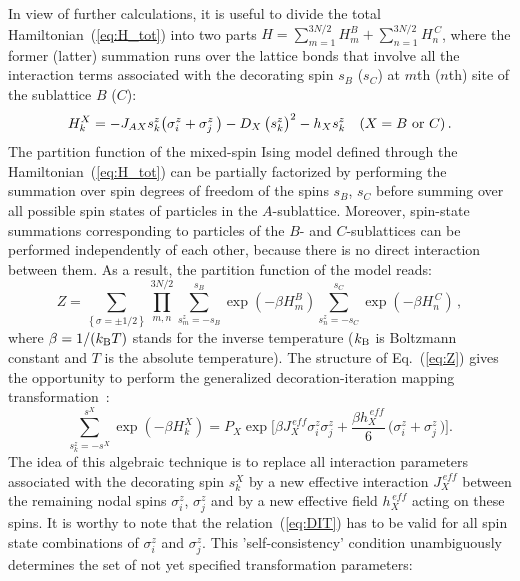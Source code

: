 \documentclass[final,5p,times,sort&compress]{elsarticle}
\begin{document}
In view of further calculations, it is useful to divide the total Hamiltonian~(\ref{eq:H_tot}) into two parts $H= \sum_{m=1}^{3N/2}H_m^{B}  +  \sum_{n=1}^{3N/2}H_n^{\,C}$, where the former (latter) summation runs over the lattice bonds that involve all the interaction terms associated with the decorating spin $s_{B}$ ($s_{C}$) at $m$th ($n$th) site of the sublattice $B$ ($C$):
\begin{equation}
\label{eq:H_k}
H_k^{X}=  -J_{AX}s_{k}^{z}\big(\sigma_{i}^{z} + \sigma_{j}^{z}\,\big) - D_{X}\,\big(s_{k}^{z}\big)^{2}
- h_X s_{k}^{z}\quad (X=B\,\,{\rm or}\,\,C)\,.
\end{equation}
The partition function of the mixed-spin Ising model defined through the Hamiltonian~(\ref{eq:H_tot}) can be partially factorized by performing the summation over spin degrees of freedom of the spins $s_{B}$, $s_{C}$ before summing over all possible spin states of particles in the $A$-sublattice. Moreover, spin-state summations corresponding to particles of the $B$- and $C$-sublattices can be performed independently of each other, because there is no direct interaction between them. As a result, the partition function of the model reads:
\begin{equation}
\label{eq:Z}
Z= \sum_{\left\{\sigma = \pm1/2\right\}}\prod_{m,n}^{3N/2}\sum_{s_{m}^{z}= -s_{B}}^{s_{B}}\!\!\exp{\left(-\beta H_m^{B}\right)}\sum_{s_{n}^{z}= -s_{C}}^{s_{C}}\!\!\exp{\left(-\beta H_n^{\,C}\right)}\,,
\end{equation}
where $\beta = 1/(k_{\rm B}T)$ stands for the inverse temperature ($k_{\rm B}$ is Boltzmann constant and $T$ is the absolute temperature). The structure of Eq.~(\ref{eq:Z}) gives the opportunity to perform the generalized decoration-iteration mapping transformation~\cite{Fis59,Dom60,Syo72,Str10}:
\begin{equation}
\label{eq:DIT}
\sum_{s_{k}^{z}= -s^{X}}^{s^{X}}\!\!\exp{\left(-\beta H_k^{X}\right)}= P_X \exp{\bigg[\beta J_{X}^{\,e\!f\!f}\sigma_{i}^{z}\sigma_{j}^{z} + \frac{\beta h_{X}^{\,e\!f\!f}}{6}\,\big(\sigma_{i}^{z} + \sigma_{j}^{z}\,\big)\bigg]}.
\end{equation}
The idea of this algebraic technique is to replace all interaction parameters associated with the decorating spin $s_k^{X}$ by a new effective interaction $J_{X}^{\,e\!f\!f}$ between the remaining nodal spins $\sigma_{i}^{z}$, $\sigma_{j}^{z}$ and by a new effective field $h_{X}^{\,e\!f\!f}$ acting on these spins. It is worthy to note that the relation~(\ref{eq:DIT}) has to be valid for all spin state combinations of $\sigma_{i}^{z}$ and $\sigma_{j}^{z}$. This 'self-consistency' condition unambiguously determines the set of not yet specified transformation parameters:
\end{document}
